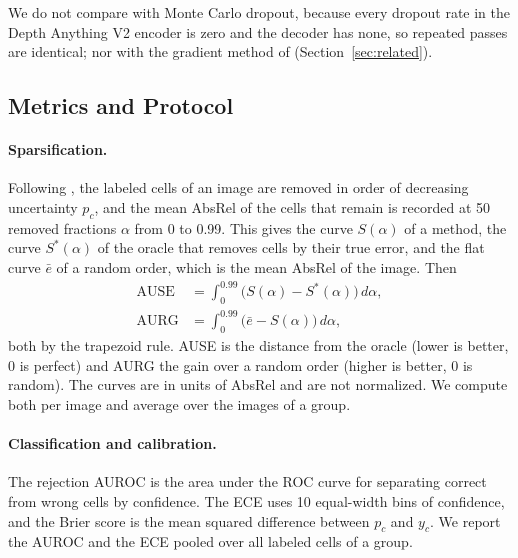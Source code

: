 We do not compare with Monte Carlo dropout, because every dropout rate in the Depth Anything V2 encoder is zero and the decoder has none, so repeated passes are identical; nor with the gradient method of \citet{hornauer2022gradient} (Section~\ref{sec:related}).

\subsection{Metrics and Protocol}
\label{sec:protocol}

\paragraph{Sparsification.} Following \citet{poggi2020uncertainty}, the labeled cells of an image are removed in order of decreasing uncertainty $p_c$, and the mean AbsRel of the cells that remain is recorded at 50 removed fractions $\alpha$ from 0 to 0.99. This gives the curve $S(\alpha)$ of a method, the curve $S^{*}(\alpha)$ of the oracle that removes cells by their true error, and the flat curve $\bar e$ of a random order, which is the mean AbsRel of the image. Then
\begin{align}
  \mathrm{AUSE} &= \int_{0}^{0.99} \bigl( S(\alpha) - S^{*}(\alpha) \bigr)\, d\alpha, \label{eq:ause} \\
  \mathrm{AURG} &= \int_{0}^{0.99} \bigl( \bar e - S(\alpha) \bigr)\, d\alpha, \label{eq:aurg}
\end{align}
both by the trapezoid rule. AUSE is the distance from the oracle (lower is better, 0 is perfect) and AURG the gain over a random order (higher is better, 0 is random). The curves are in units of AbsRel and are not normalized. We compute both per image and average over the images of a group. 

\paragraph{Classification and calibration.} The rejection AUROC is the area under the ROC curve for separating correct from wrong cells by confidence. The ECE uses 10 equal-width bins of confidence, and the Brier score is the mean squared difference between $p_c$ and $y_c$. We report the AUROC and the ECE pooled over all labeled cells of a group. 

